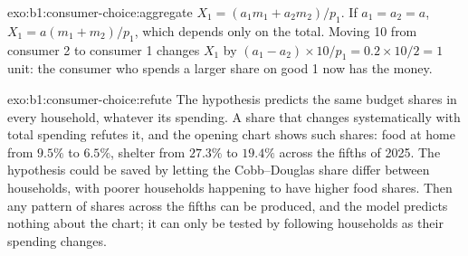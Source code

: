 \begin{solution}{exo:b1:consumer-choice:aggregate}
$X_1 = (a_1m_1 + a_2m_2)/p_1$. If $a_1 = a_2 = a$, $X_1 = a(m_1 + m_2)/p_1$,
which depends only on the total. Moving 10 from consumer 2 to consumer 1
changes $X_1$ by $(a_1 - a_2) \times 10/p_1 = 0.2 \times 10/2 = 1$ unit: the
consumer who spends a larger share on good 1 now has the money.
\end{solution}

\begin{solution}{exo:b1:consumer-choice:refute}
The hypothesis predicts the same budget shares in every household,
whatever its spending. A share that changes systematically with total
spending refutes it, and the opening chart shows such shares: food at home
from $9.5\%$ to $6.5\%$, shelter from $27.3\%$ to $19.4\%$ across the fifths of
2025. The hypothesis could be saved by letting the Cobb--Douglas share
differ between households, with poorer households happening to have higher
food shares. Then any pattern of shares across the fifths can be produced,
and the model predicts nothing about the chart; it can only be tested by
following households as their spending changes.
\end{solution}

